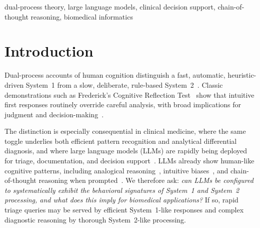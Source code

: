\documentclass[conference]{IEEEtran}
\begin{document}
\begin{abstract}
Dual-process theory distinguishes fast, intuitive System~1 from slow, analytical System~2 processing, a distinction central to clinical decision-making. We ask whether LLMs exhibit analogous behavioral signatures under systematic parameter manipulation. Unlike prior work that confounds model capacity, temperature, and prompting, we run a $2 \times 2 \times 2$ factorial ablation that isolates each factor. The central finding is a strong Prompt $\times$ Task Category interaction ($F(2, 4794) = 89.2$, $p < .001$, $\eta^2_p = .036$): CoT yields a $+31.2$-point gain on analytical tasks and an $11.1$-point raw decrement on intuitive ones (half of which is a format artefact on one coreference benchmark; the interaction survives its exclusion, $F(2, 4570) = 71.7$, $p < .001$). We replicate across four LLM families and on 100 MedQA-USMLE vignettes, and stress-test conflict performance with 50 novel memorization-resistant items. These findings support configuring clinical decision-support LLMs with System~1-like settings for routine triage and System~2-like settings for complex diagnosis.
\end{abstract}

\begin{IEEEkeywords}
dual-process theory, large language models, clinical decision support, chain-of-thought reasoning, biomedical informatics
\end{IEEEkeywords}

\section{Introduction}
\label{sec:intro}

Dual-process accounts of human cognition distinguish a fast, automatic, heuristic-driven System~1 from a slow, deliberate, rule-based System~2~\cite{Kahneman2011, Stanovich2000}. Classic demonstrations such as Frederick's Cognitive Reflection Test~\cite{Frederick2005} show that intuitive first responses routinely override careful analysis, with broad implications for judgment and decision-making~\cite{Tversky1974}.

The distinction is especially consequential in clinical medicine, where the same toggle underlies both efficient pattern recognition and analytical differential diagnosis, and where large language models (LLMs) are rapidly being deployed for triage, documentation, and decision support~\cite{Singhal2023, Thirunavukarasu2023, Lee2023}. LLMs already show human-like cognitive patterns, including analogical reasoning~\cite{Webb2023}, intuitive biases~\cite{Hagendorff2023}, and chain-of-thought reasoning when prompted~\cite{Wei2022}. We therefore ask: \textit{can LLMs be configured to systematically exhibit the behavioral signatures of System~1 and System~2 processing, and what does this imply for biomedical applications?} If so, rapid triage queries may be served by efficient System~1-like responses and complex diagnostic reasoning by thorough System~2-like processing.
\end{document}
